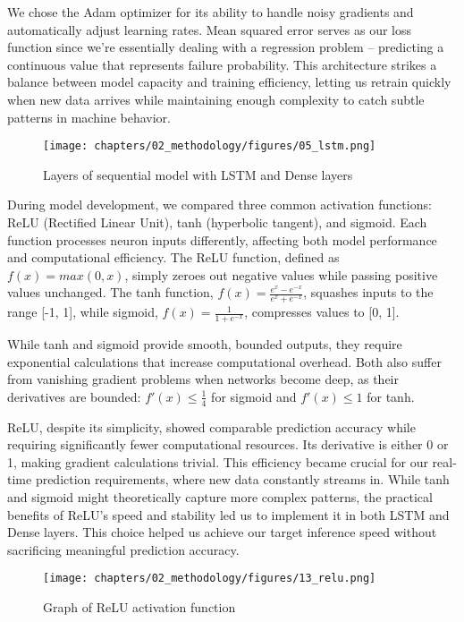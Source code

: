 We chose the Adam optimizer for its ability to handle noisy gradients and automatically adjust learning rates. Mean squared error serves as our loss function since we're essentially dealing with a regression problem – predicting a continuous value that represents failure probability. This architecture strikes a balance between model capacity and training efficiency, letting us retrain quickly when new data arrives while maintaining enough complexity to catch subtle patterns in machine behavior.

\begin{figure}[H]
    \centering
    \texttt{[image: chapters/02\_methodology/figures/05\_lstm.png]}
    \caption{Layers of sequential model with LSTM and Dense layers}
\end{figure}


During model development, we compared three common activation functions: ReLU (Rectified Linear Unit), tanh (hyperbolic tangent), and sigmoid. Each function processes neuron inputs differently, affecting both model performance and computational efficiency.
The ReLU function, defined as \(f(x) = max(0, x)\), simply zeroes out negative values while passing positive values unchanged. The tanh function, \(f(x) = \frac{e^x - e^{-x}}{e^x + e^{-x}}\), squashes inputs to the range [-1, 1], while sigmoid, \(f(x) = \frac{1}{1 + e^{-x}}\), compresses values to [0, 1]. 

While tanh and sigmoid provide smooth, bounded outputs, they require exponential calculations that increase computational overhead. Both also suffer from vanishing gradient problems when networks become deep, as their derivatives are bounded: \(f'(x) \leq \frac{1}{4}\) for sigmoid and \(f'(x) \leq 1\) for tanh.

ReLU, despite its simplicity, showed comparable prediction accuracy while requiring significantly fewer computational resources. Its derivative is either 0 or 1, making gradient calculations trivial. This efficiency became crucial for our real-time prediction requirements, where new data constantly streams in. While tanh and sigmoid might theoretically capture more complex patterns, the practical benefits of ReLU's speed and stability led us to implement it in both LSTM and Dense layers. This choice helped us achieve our target inference speed without sacrificing meaningful prediction accuracy.

\begin{figure}[H]
    \centering
    \texttt{[image: chapters/02\_methodology/figures/13\_relu.png]}
    \caption{Graph of ReLU activation function}
    \label{fig:relu-graph}
\end{figure}

